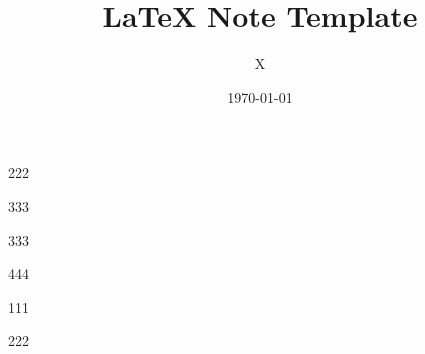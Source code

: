 \documentclass[12pt,a4paper]{article}
\title{\LaTeX{} Note Template}
\author{X}
\date{\today}
\begin{document}
{}

\begin{theorem}
    222
\end{theorem}

\begin{theoremplain}
    333
\end{theoremplain}

\begin{theorem*}
    333
\end{theorem*}


\begin{proposition}
    444
\end{proposition}


\begin{lemma}
    111
\end{lemma}

\begin{claim}
    222
\end{claim}
    
\end{document}
